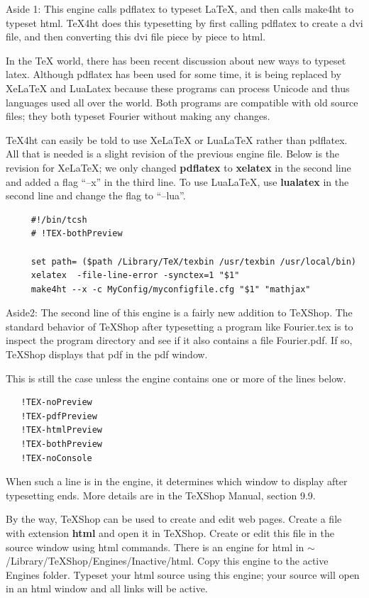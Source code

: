 \documentclass[11pt, oneside]{article}   	%
\begin{document}
Aside 1: This engine calls pdflatex to typeset LaTeX, and then calls make4ht to typeset html.
TeX4ht does this typesetting by first calling pdflatex to create a dvi  file, and then converting this
dvi file piece by piece to html. 

In the TeX world, there has been recent discussion about
new ways to typeset latex. Although pdflatex has been used for some time, it is being replaced by
XeLaTeX and LuaLatex because these programs can process Unicode and thus languages used
all over the world. Both programs are  compatible with old source files; 
they both typeset Fourier without making any changes.  

TeX4ht can easily be told to use XeLaTeX or LuaLaTeX rather than pdflatex. All that is needed is a slight revision of the previous engine file. 
Below is the revision for XeLaTeX; we only changed {\bf pdflatex} to {\bf xelatex} in the second line
and added a flag ``--x'' in the third line. To use LuaLaTeX,  use {\bf lualatex} in the second line and
change the flag to ``--lua''.
\begin{verbatim}
     #!/bin/tcsh
     # !TEX-bothPreview

     set path= ($path /Library/TeX/texbin /usr/texbin /usr/local/bin)
     xelatex  -file-line-error -synctex=1 "$1"
     make4ht --x -c MyConfig/myconfigfile.cfg "$1" "mathjax"
\end{verbatim}

Aside2: The second line of this engine is a fairly new addition to TeXShop. The standard behavior of TeXShop after typesetting a program like Fourier.tex is to inspect the program directory and see if it also contains a file Fourier.pdf. If so, TeXShop displays that pdf in the pdf window.

This is still the case unless the engine contains one or more of the lines below.
\begin{verbatim}
   !TEX-noPreview
   !TEX-pdfPreview
   !TEX-htmlPreview
   !TEX-bothPreview
   !TEX-noConsole
\end{verbatim}
When such a line is in the engine, it determines which window to display after typesetting ends.
More details are in the TeXShop Manual, section 9.9.

By the way, TeXShop can be used to create and edit web pages. Create a file with extension {\bf html} and
open it in TeXShop. Create or edit this file in the source window using html commands. There is an engine for html in  $\sim$/Library/TeXShop/Engines/Inactive/html. Copy this engine to the
active Engines folder. Typeset your html source using this engine; your source will
open in an html window and all links will be active.
\end{document}

